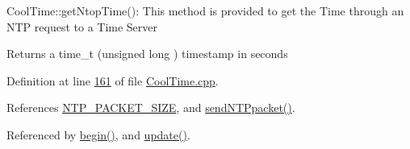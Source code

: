 Cool\+Time\+::get\+Ntop\+Time()\+: This method is provided to get the Time through an N\+TP request to a Time Server

\begin{DoxyReturn}{Returns}
a time\+\_\+t (unsigned long ) timestamp in seconds 
\end{DoxyReturn}


Definition at line \hyperlink{_cool_time_8cpp_source_l00161}{161} of file \hyperlink{_cool_time_8cpp_source}{Cool\+Time.\+cpp}.



References \hyperlink{_cool_time_8h_source_l00022}{N\+T\+P\+\_\+\+P\+A\+C\+K\+E\+T\+\_\+\+S\+I\+ZE}, and \hyperlink{_cool_time_8cpp_source_l00196}{send\+N\+T\+Ppacket()}.



Referenced by \hyperlink{_cool_time_8cpp_source_l00030}{begin()}, and \hyperlink{_cool_time_8cpp_source_l00048}{update()}.


